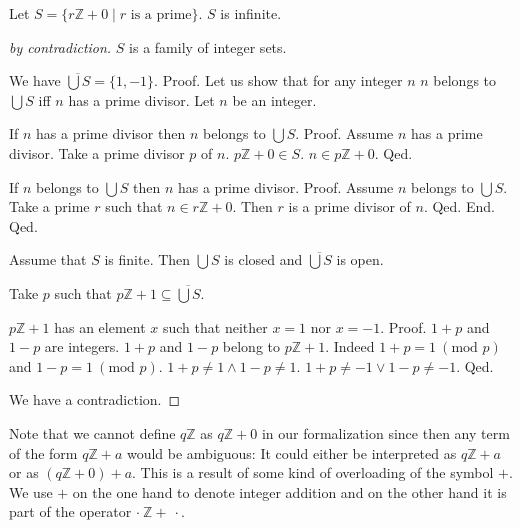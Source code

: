 \documentclass{article}
\renewcommand{\mod}{\text{mod }}
\newcommand{\Int}{\mathbb{Z}}
\begin{document}
  \begin{forthel}
    \begin{theorem}[Fuerstenberg]
      Let $S = \{ r \Int + 0 \mid r \text{ is a prime} \}$.
      $S$ is infinite.
    \end{theorem}
    \begin{proof}[by contradiction]
      $S$ is a family of integer sets.

      We have $\overline{\bigcup S} = \{ 1, -1 \}$. \newline
      Proof.
        Let us show that for any integer $n$ $n$ belongs to $\bigcup S$ iff $n$ has a prime divisor.
          Let $n$ be an integer.

          If $n$ has a prime divisor then $n$ belongs to $\bigcup S$. \newline
          Proof.
            Assume $n$ has a prime divisor.
            Take a prime divisor $p$ of $n$.
            $p \Int + 0 \in S$.
            $n \in p \Int + 0$.
          Qed.

          If $n$ belongs to $\bigcup S$ then $n$ has a prime divisor. \newline
          Proof.
            Assume $n$ belongs to $\bigcup S$.
            Take a prime $r$ such that $n \in r \Int + 0$.
            Then $r$ is a prime divisor of $n$.
          Qed.
        End.
      Qed.

      Assume that $S$ is finite.
      Then $\bigcup S$ is closed and $\overline{\bigcup S}$ is open.

      Take $p$ such that $p \Int + 1 \subseteq \overline{\bigcup S}$.

      $p \Int + 1$ has an element $x$ such that neither $x = 1$ nor $x = -1$. \newline
      Proof.
        $1 + p$ and $1 - p$ are integers.
        $1 + p$ and $1 - p$ belong to $p \Int + 1$.
        Indeed $1 + p = 1 ~(\mod p)$ and $1 - p = 1 ~(\mod p)$.
        $1 + p \neq  1 \wedge 1 - p \neq  1$.
        $1 + p \neq -1 \vee 1 - p \neq -1$.
      Qed.

      We have a contradiction.
    \end{proof}
  \end{forthel}

  Note that we cannot define $q \Int$ as $q \Int + 0$ in our formalization since then any term of
  the form $q \Int + a$ would be ambiguous: It could either be interpreted as $q \Int + a$ or as
  $(q \Int + 0) + a$. This is a result of some kind of overloading of the symbol $+$. We use $+$ on
  the one hand to denote integer addition and on the other hand it is part of the operator
  $\cdot ~ \Int + ~ \cdot$.
\end{document}
